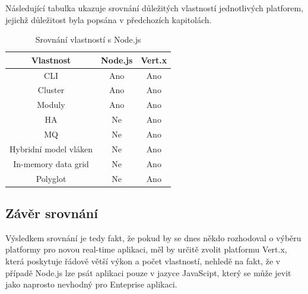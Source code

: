 Následující tabulka ukazuje srovnání důležitých vlastností jednotlivých platforem, jejichž důležitost byla popsána v předchozích kapitolách.
\begin{table}[h]
\centering
\caption{Srovnání vlastností s Node.js}
\begin{tabular}{ |c|c|c| }
\hline
\textsf{\textbf{Vlastnost}} & \textsf{\textbf{Node.js}} & \textsf{\textbf{Vert.x}}\tabularnewline
\hline
CLI & Ano & Ano\tabularnewline
\hline 
Cluster & Ano & Ano\tabularnewline
\hline
Moduly & Ano & Ano\tabularnewline
\hline 
HA & Ne & Ano\tabularnewline
\hline
MQ & Ne & Ano\tabularnewline
\hline 
Hybridní model vláken & Ne & Ano\tabularnewline
\hline 
In-memory data grid & Ne & Ano\tabularnewline
\hline 
Polyglot & Ne & Ano\tabularnewline
\hline
\end{tabular}
\end{table}

\subsection{Závěr srovnání}

Výsledkem srovnání je tedy fakt, že pokud by se dnes někdo rozhodoval o výběru platformy pro novou real-time aplikaci, měl by určitě zvolit platformu Vert.x, která poskytuje řádově větší výkon a počet vlastností, nehledě na fakt, že v případě Node.js lze psát aplikaci pouze v jazyce JavaScipt, který se může jevit jako naprosto nevhodný pro Enteprise aplikaci.